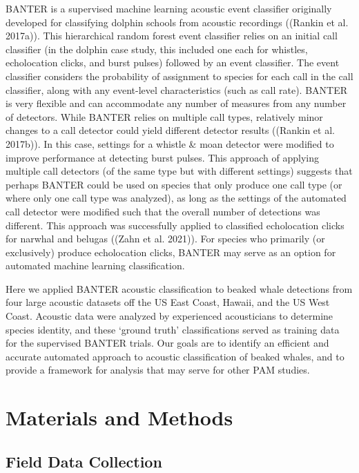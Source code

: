 \documentclass[
  letterpaper,
  DIV=11,
  numbers=noendperiod]{scrartcl}
\begin{document}
BANTER is a supervised machine learning acoustic event classifier
originally developed for classifying dolphin schools from acoustic
recordings ((Rankin et al. 2017a)). This hierarchical random forest
event classifier relies on an initial call classifier (in the dolphin
case study, this included one each for whistles, echolocation clicks,
and burst pulses) followed by an event classifier. The event classifier
considers the probability of assignment to species for each call in the
call classifier, along with any event-level characteristics (such as
call rate). BANTER is very flexible and can accommodate any number of
measures from any number of detectors. While BANTER relies on multiple
call types, relatively minor changes to a call detector could yield
different detector results ((Rankin et al. 2017b)). In this case,
settings for a whistle \& moan detector were modified to improve
performance at detecting burst pulses. This approach of applying
multiple call detectors (of the same type but with different settings)
suggests that perhaps BANTER could be used on species that only produce
one call type (or where only one call type was analyzed), as long as the
settings of the automated call detector were modified such that the
overall number of detections was different. This approach was
successfully applied to classified echolocation clicks for narwhal and
belugas ((Zahn et al. 2021)). For species who primarily (or exclusively)
produce echolocation clicks, BANTER may serve as an option for automated
machine learning classification.

Here we applied BANTER acoustic classification to beaked whale
detections from four large acoustic datasets off the US East Coast,
Hawaii, and the US West Coast. Acoustic data were analyzed by
experienced acousticians to determine species identity, and these
`ground truth' classifications served as training data for the
supervised BANTER trials. Our goals are to identify an efficient and
accurate automated approach to acoustic classification of beaked whales,
and to provide a framework for analysis that may serve for other PAM
studies.

\hypertarget{materials-and-methods}{%
\section{Materials and Methods}\label{materials-and-methods}}

\hypertarget{field-data-collection}{%
\subsection{Field Data Collection}\label{field-data-collection}}
\end{document}

